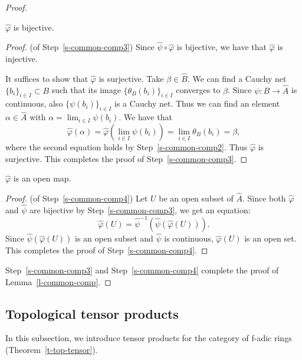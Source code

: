 \begin{proof}
\begin{step}\label{s-common-comp3}
$\widehat{\varphi}$ is bijective. 
\end{step}

\begin{proof}(of Step~\ref{s-common-comp3}) 
Since $\widehat{\psi} \circ \widehat{\varphi}$ is bijective, 
we have that $\widehat{\varphi}$ is injective. 

It suffices to show that $\widehat{\varphi}$ is surjective. 
Take $\beta \in \widehat{B}$. 
We can find a Cauchy net $\{b_i\}_{i \in I} \subset B$ 
such that its image $\{\theta_B(b_i)\}_{i \in I}$ converges to $\beta$. 
Since $\psi:B \to \widehat{A}$ is continuous, 
also $\{\psi(b_i)\}_{i \in I}$ is a Cauchy net. 
Thus we can find an element $\alpha \in \widehat{A}$ 
with $\alpha=\lim_{i \in I}\psi(b_i)$. 
We have that 
$$\widehat{\varphi}(\alpha)=\widehat{\varphi}\left(\lim_{i \in I}\psi(b_i)\right)=\lim_{i \in I}\theta_B(b_i)=\beta,$$
where the second equation holds by Step~\ref{s-common-comp2}. 
Thus $\widehat{\varphi}$ is surjective. 
This completes the proof of Step~\ref{s-common-comp3}.
\end{proof}

\begin{step}\label{s-common-comp4}
$\widehat{\varphi}$ is an open map. 
\end{step}

\begin{proof}(of Step~\ref{s-common-comp4}) 
Let $U$ be an open subset of $\widehat{A}$. 
Since both $\widehat{\varphi}$ and $\widehat{\psi}$ are bijective by Step~\ref{s-common-comp3}, 
we get an equation: 
$$\widehat{\varphi}(U)=\widehat{\psi}^{-1}(\widehat{\psi}(\widehat{\varphi}(U))).$$
Since $\widehat{\psi}(\widehat{\varphi}(U))$ is an open subset and 
$\widehat{\psi}$ is continuous, 
$\widehat{\varphi}(U)$ is an open set. 
This completes the proof of Step~\ref{s-common-comp4}.
\end{proof}
Step~\ref{s-common-comp3} 
and Step~\ref{s-common-comp4} 
complete the proof of Lemma~\ref{l-common-comp}. 
\end{proof}

\subsection{Topological tensor products}

In this subsection, we introduce tensor products 
for the category of f-adic rings (Theorem~\ref{t-top-tensor}). 


